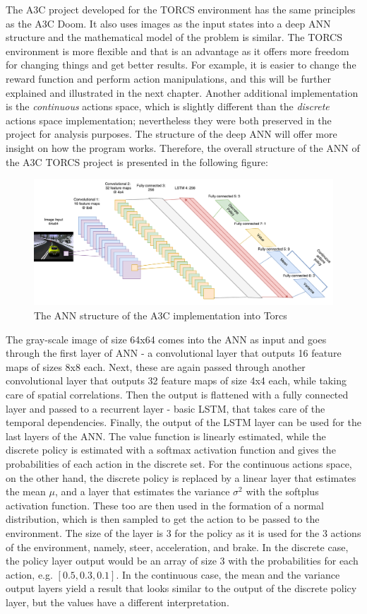 The A3C project developed for the TORCS environment has the same principles as the A3C Doom. It also uses images as the input states into a deep ANN structure and the mathematical model of the problem is similar. The TORCS environment is more flexible and that is an advantage as it offers more freedom for changing things and get better results. For example, it is easier to change the reward function and perform action manipulations, and this will be further explained and illustrated in the next chapter. Another additional implementation is the \textit{continuous} actions space, which is slightly different than the \textit{discrete} actions space implementation; nevertheless they were both preserved in the project for analysis purposes. The structure of the deep ANN will offer more insight on how the program works. Therefore, the overall structure of the ANN of the A3C TORCS project is presented in the following figure:
\begin{figure}[H]
	\centering
	\includegraphics[width=1.25\textwidth]{Figures/A3CTorcs}
	\caption{The ANN structure of the A3C implementation into Torcs}
	\label{A3CTorcs}
\end{figure}
The gray-scale image of size 64x64 comes into the ANN as input and goes through the first layer of ANN - a convolutional layer that outputs 16 feature maps of sizes 8x8 each. Next, these are again passed through another convolutional layer that outputs 32 feature maps of size 4x4 each, while taking care of spatial correlations. Then the output is flattened with a fully connected layer and passed to a recurrent layer - basic LSTM, that takes care of the temporal dependencies. Finally, the output of the LSTM layer can be used for the last layers of the ANN. The value function is linearly estimated, while the discrete policy is estimated with a softmax activation function and gives the probabilities of each action in the discrete set. For the continuous actions space, on the other hand, the discrete policy is replaced by a linear layer that estimates the mean $\mu$, and a layer that estimates the variance $\sigma^2$ with the softplus activation function. These too are then used in the formation of a normal distribution, which is then sampled to get the action to be passed to the environment. The size of the layer is 3 for the policy as it is used for the 3 actions of the environment, namely, steer, acceleration, and brake. In the discrete case, the policy layer output would be an array of size 3 with the probabilities for each action, e.g. $\left [ 0.5, 0.3, 0.1 \right ]$. In the continuous case, the mean and the variance output layers yield a result that looks similar to the output of the discrete policy layer, but the values have a different interpretation.

